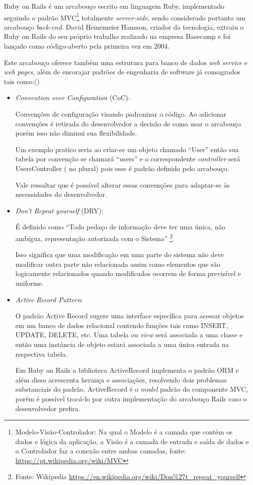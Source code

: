 \par Ruby on Rails é um arcabouço escrito em linguagem Ruby, implementado seguindo o padrão MVC\footnote{Modelo-Visão-Controlador: Na qual o Modelo é a camada que contém os dados e lógica da aplicação, a Visão é a camada de entrada e saída de dados e o Controlador faz a conexão entre ambas camadas, fonte: \url{https://pt.wikipedia.org/wiki/MVC} } totalmente \emph{server-side}, sendo considerado portanto um arcabouço \emph{back-end}. David Heinemeier Hansson, criador da tecnologia, extraiu o Ruby on Rails do seu próprio trabalho realizado na empresa Basecamp e foi lançado como código-aberto pela primeira vez em 2004.
\par Este arcabouço oferece também uma estrutura para banco de dados \emph{web service} e \emph{web pages}, além de encorajar padrões de engenharia de software já consagrados tais como:(\cite{railswiki})
\begin{itemize}
\item {\emph{Convention over Configuration} (CoC):}
    \par Convenções de configuração visando padronizar o código. Ao adicionar convenções é retirada do desenvolvedor a decisão de como usar o arcabouço porém isso não diminui sua flexibilidade.
    \par Um exemplo pratico seria ao criar-se um objeto chamado ``User'' então sua tabela por convenção se chamará ``users'' e o correspondente \emph{controller} será UsersController ( no plural) pois esse é padrão definido pelo arcabouço.
    \par Vale ressaltar que é possível alterar essas convenções para adaptar-se às necessidades do desenvolvedor.

\item {\emph{Don't Repeat yourself} (DRY):}
    \par É definido como ``Todo pedaço de informação deve ter uma única, não ambígua, representação autorizada com o Sistema'' \footnote{Fonte: Wikipedia \url{https://en.wikipedia.org/wiki/Don\%27t_repeat_yourself}}.
    \par Isso significa que uma modificação em uma parte do sistema não deve modificar outra parte não relacionada assim como elementos que são logicamente relacionados quando modificados ocorrem de forma previsível e uniforme.

\item { \emph{Active Record Pattern}:}
    \par O padrão Active Record sugere uma interface específica para acessar objetos em um banco de dados relacional contendo funções tais como INSERT, UPDATE, DELETE, etc. Uma tabela ou \emph{view} será associada a uma classe e então uma instância de objeto estará associada a uma única entrada na respectiva tabela.
    \par Em Ruby on Rails a biblioteca ActiveRecord implementa o padrão ORM e além disso acrescenta herança e associações, resolvendo dois problemas substanciais do padrão. ActiveRecord é o \emph{model} padrão do componente MVC, porém é possível trocá-lo por outra implementação do arcabouço Rails caso o desenvolvedor prefira.
\end{itemize}
